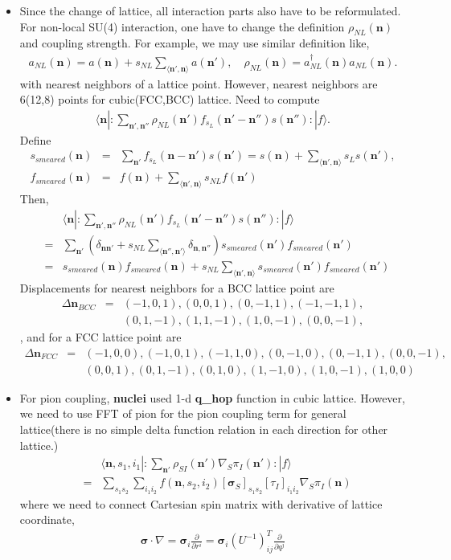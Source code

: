 \documentclass[10pt]{book}
\def\bm{\boldsymbol}
\newcommand{\bea}{\begin{eqnarray}}
\newcommand{\eea}{\end{eqnarray}}
\newcommand{\no}{\nonumber \\}
\newcommand{\del}{\partial}
\def\vs{{\bm \sigma}}
\def\vn{{\bm n}}
\def\la{\langle}
\def\ra{\rangle}
\begin{document}
\begin{itemize}
	\item Since the change of lattice, all interaction parts also have to be reformulated.
	      For non-local SU(4) interaction, one have to change the definition $\rho_{NL}(\vn)$ 
	      and coupling strength. For example, we may use similar definition like,
	      \bea 
            a_{NL}(\vn)=a(\vn)+s_{NL}\sum_{\la\vn',\vn\ra } a(\vn'), 
            \quad \rho_{NL}(\vn)=a^\dagger_{NL}(\vn)a_{NL}(\vn).
          \eea 
	       with nearest neighbors of a lattice point. However, {\color{red}nearest neighbors
	      are 6(12,8) points for cubic(FCC,BCC) lattice.} 
	      Need to compute
	      \bea 
	      \la \vn|: \sum_{\vn',\vn''} \rho_{NL}(\vn') f_{s_L}(\vn'-\vn'') s(\vn'') :|f\ra .
	      \eea 
	      Define
	      \bea 
	      s_{smeared}(\vn)&=&\sum_{\vn'}f_{s_L}(\vn-\vn') s(\vn')
	                      =s(\vn) +\sum_{\la \vn',\vn\ra } s_L s(\vn'),  \no 
	      f_{smeared}(\vn)&=& f(\vn) +\sum_{\la \vn',\vn\ra } s_{NL} f(\vn')                 
	      \eea 
	      Then,
	      \bea 
	      & & \la \vn|: \sum_{\vn',\vn''} \rho_{NL}(\vn') f_{s_L}(\vn'-\vn'') s(\vn'') :|f\ra  \no 
	      &=& \sum_{\vn'} \left(\delta_{\vn\vn'}+s_{NL}\sum_{\la \vn'',\vn'\ra }\delta_{\vn,\vn''} \right)
	                     s_{smeared}(\vn') f_{smeared}(\vn') \no 
	      &=& s_{smeared}(\vn) f_{smeared}(\vn)
	         +s_{NL}\sum_{\la \vn',\vn\ra }s_{smeared}(\vn') f_{smeared}(\vn')               
	      \eea 
	      Displacements for nearest neighbors for a BCC lattice point are 
	      \bea 
	      \Delta \vn_{BCC} &=& (-1,0,1),(0,0,1),(0,-1,1),(-1,-1,1),\no 
	                 & & (0,1,-1),(1,1,-1),(1,0,-1),(0,0,-1),
	      \eea, 
	      and for a FCC lattice point are
	      \bea 
	      \Delta \vn_{FCC} &=& (-1,0,0),(-1,0,1),(-1,1,0),(0,-1,0),(0,-1,1),(0,0,-1), \no 
	                 & & (0,0,1),(0,1,-1),(0,1,0),(1,-1,0),(1,0,-1),(1,0,0)
	      \eea 
	\item For pion coupling, {\bf nuclei} used 1-d {\bf q\_hop} function
	      in cubic lattice. However, we need to use FFT of pion for the 
	      pion coupling term for general lattice(there is no simple delta function relation
	      in each direction for other lattice.)
	      \bea 
	      & &\la \vn, s_1, i_1 | : \sum_{\vn'}  \rho_{SI}(\vn')\nabla_S\pi_I(\vn'): |f\ra \no 
	      &=&\sum_{s_1 s_2}\sum_{i_1 i_2} f(\vn, s_2,i_2) [\vs_S]_{s_1 s_2}[\tau_I]_{i_1 i_2} \nabla_S \pi_I(\vn)
	      \eea 
	      where we need to connect Cartesian spin matrix with derivative of lattice coordinate,  
	      \bea 
	         \vs \cdot \nabla = \vs_i \frac{\del}{\del r^i}
	                         =\vs_i (U^{-1})^T_{ij} \frac{\del}{\del q^j} 
	      \eea 
	      

\end{itemize}
\end{document}
